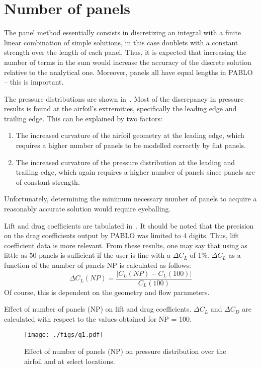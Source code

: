 \section{Number of panels}

The panel method essentially consists in discretizing an integral with a finite linear combination of
simple solutions, in this case doublets with a constant strength over the length of each panel.
Thus, it is expected that increasing the number of terms in the sum would increase the
accuracy of the discrete solution relative to the analytical one. Moreover, panels all have
equal lengths in PABLO -- this is important.

The pressure distributions are shown in~. Most of the discrepancy in pressure
results is found at the airfoil's extremities, specifically the leading edge and trailing edge.
This can be explained by two factors:
\begin{enumerate}
    \item The increased curvature of the airfoil geometry at the leading edge, which requires a higher
        number of panels to be modelled correctly by flat panels.
    \item The increased curvature of the pressure distribution at the leading and trailing edge, which
        again requires a higher number of panels since panels are of constant strength.
\end{enumerate}
Unfortunately, determining the minimum necessary number of panels to acquire a reasonably accurate
solution would require eyeballing.

Lift and drag coefficients are tabulated in~. It should be noted that the
precision on the drag coefficients output by PABLO was limited to 4 digits. Thus, lift coefficient
data is more relevant. From these results, one may say that using as little as 50 panels is sufficient
if the user is fine with a $\Delta C_L$ of 1\%. $\Delta C_L$ as a function of the number of panels
NP is calculated as follows:
\begin{equation*}
    \Delta C_L(NP) = \frac{|C_L(NP) - C_L(100)|}{C_L(100)}
\end{equation*}
Of course, this is dependent on the geometry and flow parameters.
\begin{table}
    \centering
    \caption{Effect of number of panels (NP) on lift and drag coefficients. $\Delta C_L$ and $\Delta C_D$
        are calculated with respect to the values obtained for NP = 100.}
    \label{tab:q1}
    
\end{table}

\begin{figure}[H]
    \centering
    \texttt{[image: ./figs/q1.pdf]}
    \caption{Effect of number of panels (NP) on pressure distribution over the airfoil and at
        select locations.}\label{fig:q1}
\end{figure}

